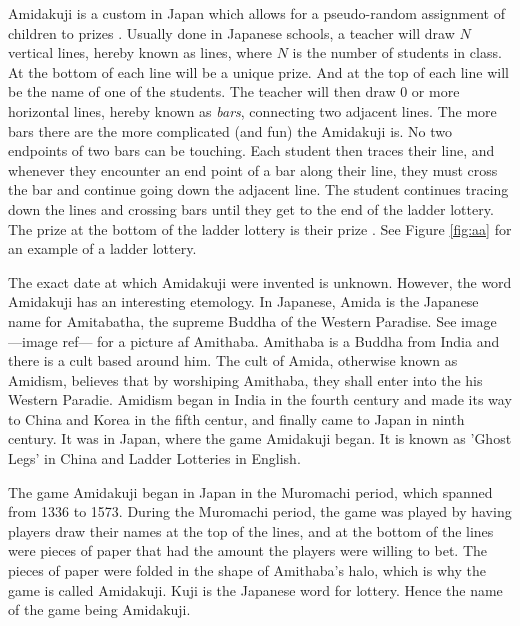 
Amidakuji is a custom in Japan which 
allows for a pseudo-random assignment of children to prizes \cite{A23}. 
Usually done in Japanese schools, a teacher will draw $N$ vertical lines, 
hereby known as lines, where $N$ is the number of students in class. 
At the bottom of each line will be a unique prize. 
And at the top of each line will be the name of one of the students.  
The teacher will then draw 0 or more horizontal lines, hereby known as \emph{bars}, 
connecting two adjacent lines. The more bars there are the more complicated (and fun) 
the Amidakuji is. No two endpoints of two bars can be touching. Each student then traces 
their line, and whenever they encounter an end point of a bar along their line, 
they must cross the bar and continue going down the adjacent line. 
The student continues tracing down the lines and crossing bars 
until they get to the end of the ladder lottery. The prize at the bottom of the ladder lottery 
is their prize \cite{A7}. See Figure \ref{fig:aa} for an example of a ladder lottery.\par
The exact date at which Amidakuji were invented is unknown. However, the word Amidakuji has
an interesting etemology. In Japanese, Amida is the Japanese name 
for Amitabatha, the supreme Buddha of the Western Paradise. See image ---image ref---
for a picture af Amithaba. Amithaba
is a Buddha from India and there is a cult based around him. The cult 
of Amida, otherwise known as Amidism, believes that by worshiping Amithaba, they shall 
enter into the his Western Paradie. Amidism began in India in the fourth century
and made its way to China and Korea in the fifth centur, and finally  came 
to Japan in ninth century. It was in Japan, where the game Amidakuji
began. It is known as 'Ghost Legs' in China and  Ladder Lotteries in English.\par
The game Amidakuji began in Japan in the Muromachi period, which spanned from
1336 to 1573. During the Muromachi period, the game was played by having
players draw their names at the top of the lines, and at the bottom 
of the lines were pieces of paper that had the amount the players
were willing to bet. The pieces of paper were folded in the shape of 
Amithaba's halo, which is why the game is called Amidakuji. Kuji 
is the Japanese word for lottery. Hence the name of the game being 
Amidakuji.\par 

